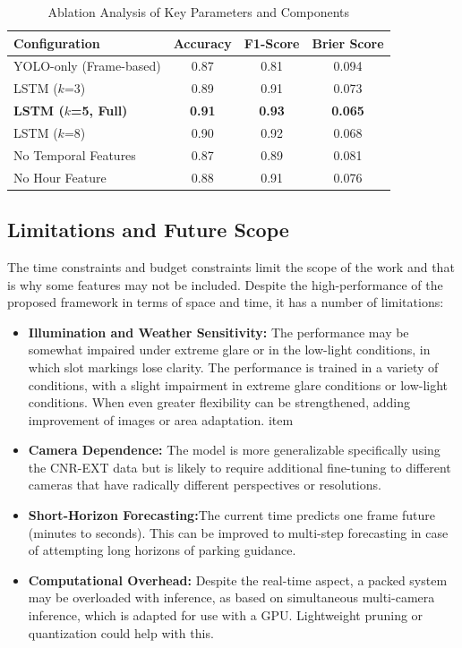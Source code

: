 \documentclass[conference]{IEEEtran}
\begin{document}
\begin{table}[htbp]
\caption{Ablation Analysis of Key Parameters and Components}
\begin{center}
\begin{tabular}{|l|c|c|c|}
\hline
\textbf{Configuration} & \textbf{Accuracy} & \textbf{F1-Score} & \textbf{Brier Score} \\
\hline
YOLO-only (Frame-based) & 0.87 & 0.81 & 0.094 \\
LSTM ($k$=3) & 0.89 & 0.91 & 0.073 \\
\textbf{LSTM ($k$=5, Full)} & \textbf{0.91} & \textbf{0.93} & \textbf{0.065} \\
LSTM ($k$=8) & 0.90 & 0.92 & 0.068 \\
No Temporal Features & 0.87 & 0.89 & 0.081 \\
No Hour Feature & 0.88 & 0.91 & 0.076 \\
\hline
\end{tabular}
\label{tab:ablation}
\end{center}
\end{table}

\subsection{Limitations and Future Scope}
The time constraints and budget constraints limit the scope of the work and that is why some features may not be included.
Despite the high-performance of the proposed framework in terms of space and time, it has a number of limitations:

\begin{itemize}
\item \textbf{Illumination and Weather Sensitivity:} The performance may be somewhat impaired under extreme glare or in the low-light conditions, in which slot markings lose clarity. The performance is trained in a variety of conditions, with a slight impairment in extreme glare conditions or low-light conditions. When even greater flexibility can be strengthened, adding improvement of images or area adaptation.
item 
\item \textbf{Camera Dependence:} The model is more generalizable specifically using the CNR-EXT data but is likely to require additional fine-tuning to different cameras that have radically different perspectives or resolutions.
\item \textbf{Short-Horizon Forecasting:}The current time predicts one frame future (minutes to seconds). This can be improved to multi-step forecasting in case of attempting long horizons of parking guidance.
\item \textbf{Computational Overhead:} Despite the real-time aspect, a packed system may be overloaded with inference, as based on simultaneous multi-camera inference, which is adapted for use with a GPU. Lightweight pruning or quantization could help with this.
\end{itemize}
\end{document}

